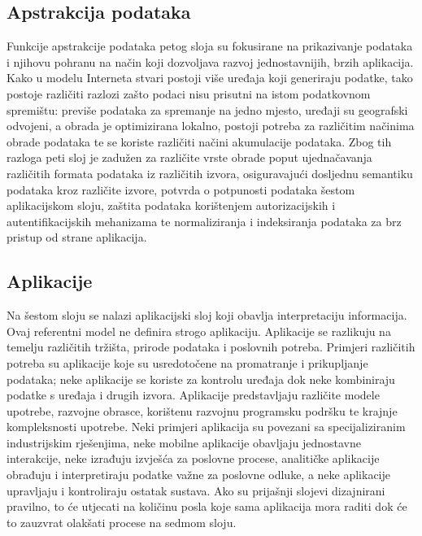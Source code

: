 \documentclass[times, utf8, diplomski]{fer}
\begin{document}
\subsection{Apstrakcija podataka}
Funkcije apstrakcije podataka petog sloja su fokusirane na prikazivanje podataka i njihovu pohranu na način koji dozvoljava razvoj jednostavnijih, brzih aplikacija. Kako u modelu Interneta stvari postoji više uređaja koji generiraju podatke, tako postoje različiti razlozi zašto podaci nisu prisutni na istom podatkovnom spremištu: previše podataka za spremanje na jedno mjesto, uređaji su geografski odvojeni, a obrada je optimizirana lokalno, postoji potreba za različitim načinima obrade podataka te se koriste različiti načini akumulacije podataka. Zbog tih razloga peti sloj je zadužen za različite vrste obrade poput ujednačavanja različitih formata podataka iz različitih izvora, osiguravajući dosljednu semantiku podataka kroz različite izvore, potvrda o potpunosti podataka šestom aplikacijskom sloju, zaštita podataka korištenjem autorizacijskih i autentifikacijskih mehanizama te normaliziranja i indeksiranja podataka za brz pristup od strane aplikacija.

\subsection{Aplikacije}
Na šestom sloju se nalazi aplikacijski sloj koji obavlja interpretaciju informacija. Ovaj referentni model ne definira strogo aplikaciju. Aplikacije se razlikuju na temelju različitih tržišta, prirode podataka i poslovnih potreba. Primjeri različitih potreba su aplikacije koje su usredotočene na promatranje i prikupljanje podataka; neke aplikacije se koriste za kontrolu uređaja dok neke kombiniraju podatke s uređaja i drugih izvora. Aplikacije predstavljaju različite modele upotrebe, razvojne obrasce, korištenu razvojnu programsku podršku te krajnje kompleksnosti upotrebe. Neki primjeri aplikacija su povezani sa specijaliziranim industrijskim rješenjima, neke mobilne aplikacije obavljaju jednostavne interakcije, neke izrađuju izvješća za poslovne procese, analitičke aplikacije obrađuju i interpretiraju podatke važne za poslovne odluke, a neke aplikacije upravljaju i kontroliraju ostatak sustava. Ako su prijašnji slojevi dizajnirani pravilno, to će utjecati na količinu posla koje sama aplikacija mora raditi dok će to zauzvrat olakšati procese na sedmom sloju. 
\end{document}
